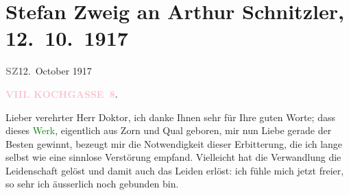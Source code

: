 

\renewcommand{\erwaehntePersonen}{Personen: Olga Schnitzler, Stefan Zweig}
\renewcommand{\erwaehnteInstitutionen}{Institutionen: Außenministerium, Neue Freie Presse, k. u. k. Kriegsministerium, Österreichisches Staatsarchiv}
\renewcommand{\erwaehnteOrte}{Orte: Kochgasse 8, Schweiz, Wien}
\renewcommand{\erwaehnteWerke}{Werke: Jeremias. Ein dramatische Dichtung in neun Bildern}
\section[Stefan Zweig an Arthur Schnitzler, 12. 10. 1917]{Stefan Zweig an Arthur Schnitzler, 12. 10. 1917}
\nopagebreak{}
\rehead{ }\normalsize\beginnumbering{}
\toendnotes[C]{\smallbreak\pagebreak[2]}
\toendnotes[C]{\smallbreak}
\pstart
           {\pb}\textcolor{gray}{\textbf{SZ}}\hfill 12. October 1917\pend
           
\pstart
           \raggedleft{}\textcolor{gray}{\textbf{\textcolor{pink}{VIII. KOCHGASSE 8}{}\ledrightnote{\textcolor{pink}{Kochgasse 8}}.}}\pend
           
\pstart
           Lieber verehrter Herr Doktor, ich danke Ihnen sehr für Ihre guten
               Worte; dass dieses \textcolor{green}{Werk}{}\ledrightnote{{$\rightarrow$}\textcolor{green}{Jeremias. Ein dramatische Dichtung in neun Bildern}}, eigentlich aus
               Zorn und Qual geboren, mir nun Liebe gerade der Besten gewinnt, bezeugt mir die
               Notwendigkeit dieser Erbitterung, die ich lange selbst wie eine sinnlose Verstörung
               empfand. Vielleicht hat die Verwandlung die Leidenschaft gelöst und damit auch das
               Leiden erlöst: ich fühle mich jetzt freier, so sehr ich äusserlich noch gebunden
               bin.\pend
           
